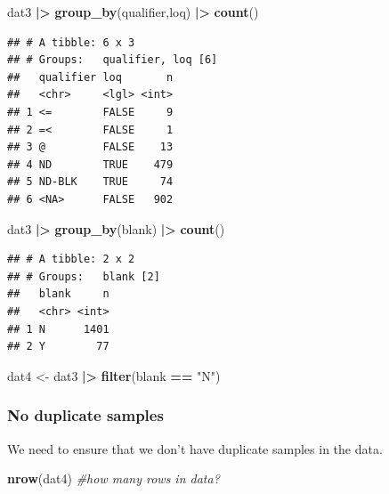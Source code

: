 \documentclass[
]{article}
\newenvironment{Shaded}{\begin{snugshade}}{\end{snugshade}}
\newcommand{\CommentTok}[1]{\textcolor[rgb]{0.56,0.35,0.01}{\textit{#1}}}
\newcommand{\FunctionTok}[1]{\textcolor[rgb]{0.13,0.29,0.53}{\textbf{#1}}}
\newcommand{\NormalTok}[1]{#1}
\newcommand{\OtherTok}[1]{\textcolor[rgb]{0.56,0.35,0.01}{#1}}
\newcommand{\SpecialCharTok}[1]{\textcolor[rgb]{0.81,0.36,0.00}{\textbf{#1}}}
\newcommand{\StringTok}[1]{\textcolor[rgb]{0.31,0.60,0.02}{#1}}
\begin{document}
\begin{Shaded}
\begin{Highlighting}[]
\NormalTok{dat3 }\SpecialCharTok{|\textgreater{}} 
  \FunctionTok{group\_by}\NormalTok{(qualifier,loq) }\SpecialCharTok{|\textgreater{}} 
  \FunctionTok{count}\NormalTok{() }
\end{Highlighting}
\end{Shaded}

\begin{verbatim}
## # A tibble: 6 x 3
## # Groups:   qualifier, loq [6]
##   qualifier loq       n
##   <chr>     <lgl> <int>
## 1 <=        FALSE     9
## 2 =<        FALSE     1
## 3 @         FALSE    13
## 4 ND        TRUE    479
## 5 ND-BLK    TRUE     74
## 6 <NA>      FALSE   902
\end{verbatim}

\begin{Shaded}
\begin{Highlighting}[]
\NormalTok{dat3 }\SpecialCharTok{|\textgreater{}} 
  \FunctionTok{group\_by}\NormalTok{(blank) }\SpecialCharTok{|\textgreater{}} 
  \FunctionTok{count}\NormalTok{()}
\end{Highlighting}
\end{Shaded}

\begin{verbatim}
## # A tibble: 2 x 2
## # Groups:   blank [2]
##   blank     n
##   <chr> <int>
## 1 N      1401
## 2 Y        77
\end{verbatim}

\begin{Shaded}
\begin{Highlighting}[]
\NormalTok{dat4 }\OtherTok{\textless{}{-}}\NormalTok{ dat3 }\SpecialCharTok{|\textgreater{}} 
  \FunctionTok{filter}\NormalTok{(blank }\SpecialCharTok{==} \StringTok{"N"}\NormalTok{) }
\end{Highlighting}
\end{Shaded}

\subsubsection{No duplicate samples}\label{no-duplicate-samples}

We need to ensure that we don't have duplicate samples in the data.

\begin{Shaded}
\begin{Highlighting}[]
\FunctionTok{nrow}\NormalTok{(dat4) }\CommentTok{\#how many rows in data?  }
\end{Highlighting}
\end{Shaded}
\end{document}
